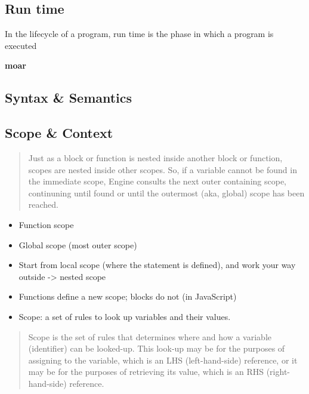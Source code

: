 \subsection{Run time}\label{run-time}

In the lifecycle of a program, run time is the phase in which a program
is executed

\textbf{moar}

\subsection{Syntax \& Semantics}\label{syntax-semantics}

\subsection{Scope \& Context}\label{scope-context}

\cite{getify}

\begin{quote}
Just as a block or function is nested inside another block or function,
scopes are nested inside other scopes. So, if a variable cannot be found
in the immediate scope, Engine consults the next outer containing scope,
continuning until found or until the outermost (aka, global) scope has
been reached.
\end{quote}

\begin{itemize}
\itemsep1pt\parskip0pt
\item
  Function scope
\item
  Global scope (most outer scope)
\item
  Start from local scope (where the statement is defined), and work your
  way outside -\textgreater{} nested scope
\item
  Functions define a new scope; blocks do not (in JavaScript)
\item
  Scope: a set of rules to look up variables and their values.
\end{itemize}

\begin{quote}
Scope is the set of rules that determines where and how a variable
(identifier) can be looked-up. This look-up may be for the purposes of
assigning to the variable, which is an LHS (left-hand-side) reference,
or it may be for the purposes of retrieving its value, which is an RHS
(right-hand-side) reference.
\end{quote}

